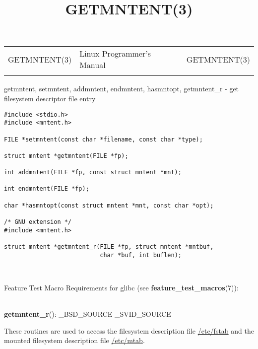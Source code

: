 \documentclass[]{article}
\title{GETMNTENT(3)}
\author{}
\date{}
\let\realtextbf=\textbf
\renewcommand{\textbf}[1]{\textcolor{boldcolor}{\realtextbf{#1}}}
\renewcommand{\emph}[1]{\underline{#1}}
\begin{document}
\maketitle

\begin{longtable}[c]{@{}lll@{}}
\toprule\addlinespace
GETMNTENT(3) & Linux Programmer's Manual & GETMNTENT(3)
\\\addlinespace
\bottomrule
\end{longtable}


getmntent, setmntent, addmntent, endmntent, hasmntopt, getmntent\_r -
get filesystem descriptor file entry


\begin{verbatim}
#include <stdio.h>
#include <mntent.h>
 
FILE *setmntent(const char *filename, const char *type);
 
struct mntent *getmntent(FILE *fp);
 
int addmntent(FILE *fp, const struct mntent *mnt);
 
int endmntent(FILE *fp);
 
char *hasmntopt(const struct mntent *mnt, const char *opt);
 
/* GNU extension */
#include <mntent.h>
 
struct mntent *getmntent_r(FILE *fp, struct mntent *mntbuf,
                           char *buf, int buflen);
\end{verbatim}

~

Feature Test Macro Requirements for glibc (see
\textbf{feature\_test\_macros}(7)): \\

~

\textbf{getmntent\_r}(): \_BSD\_SOURCE \textbar{}\textbar{}
\_SVID\_SOURCE


These routines are used to access the filesystem description file
\emph{/etc/fstab} and the mounted filesystem description file
\emph{/etc/mtab}.
\end{document}
